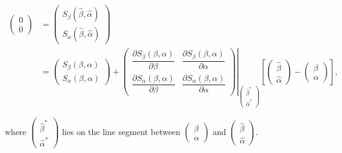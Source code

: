 \documentclass[UTF8,a4paper,10pt]{article}
\begin{document}
\begin{Problem}[]{}
\begin{equation*}
  \begin{aligned}
\left(\begin{array}{l}0 \\ 0\end{array}\right)
&=\left(\begin{array}{l}S_{\beta}(\hat{\beta}, \hat{\alpha}) \\ S_{\alpha}(\hat{\beta}, \hat{\alpha})\end{array}\right)\\
&=\left(\begin{array}{l}S_{\beta}(\beta, \alpha) \\ S_{\alpha}(\beta, \alpha)\end{array}\right)+\left.\left(\begin{array}{ll}\dfrac{\partial S_{\beta}(\beta, \alpha)}{\partial \beta} & \dfrac{\partial S_{\beta}(\beta, \alpha)}{\partial \alpha} \\ \dfrac{\partial S_{\alpha}(\beta, \alpha)}{\partial \beta} & \dfrac{\partial S_{\alpha}(\beta, \alpha)}{\partial \alpha}\end{array}\right)\right|_{\begin{pmatrix}\left.\hat{\beta}^{*}\right. \\ \hat{\alpha}^{*}\end{pmatrix}}
\left[\left(\begin{array}{l}\hat{\beta} \\ \hat{\alpha}\end{array}\right)-\left(\begin{array}{c}\beta \\ \alpha\end{array}\right)\right],
\end{aligned}
\end{equation*}

where $\left(\begin{array}{l}\hat{\beta}^{*} \\ \hat{\alpha}^{*}\end{array}\right)$ lies on the line segment between $\left(\begin{array}{l}\beta \\ \alpha\end{array}\right)$ and $\left(\begin{array}{l}\hat{\beta} \\ \hat{\alpha}\end{array}\right).$

\end{Problem}
\end{document}
